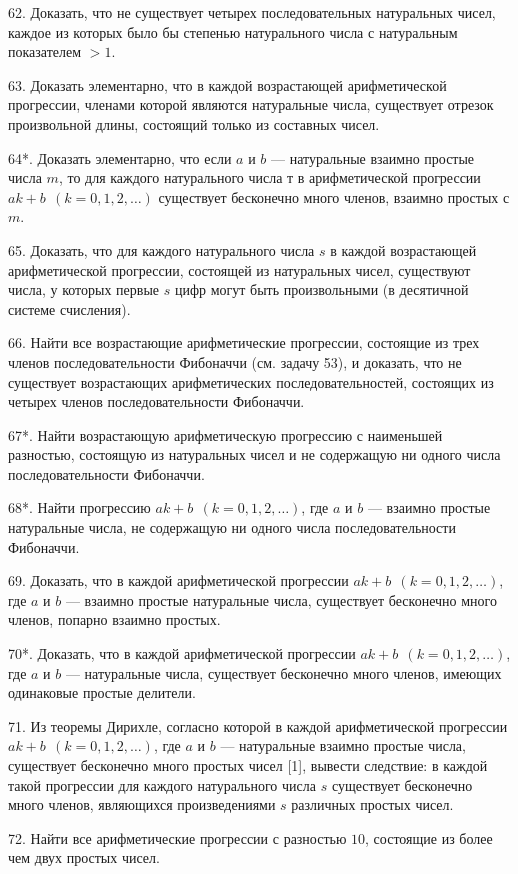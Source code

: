 \documentclass[12pt, a4paper, openany]{book}
\begin{document}
62. Доказать, что не существует четырех последовательных натуральных чисел, каждое из которых было бы степенью натурального числа с натуральным показателем $>1$.

63. Доказать элементарно, что в каждой возрастающей арифметической прогрессии, членами которой являются натуральные числа, существует отрезок произвольной длины, состоящий только из составных чисел.

64*. Доказать элементарно, что если $a$ и $b$ — натуральные взаимно простые числа $m$, то для каждого натурального числа т в арифметической прогрессии $ak+b \ \ (k=0,1,2,\ldots)$ существует бесконечно много членов, взаимно простых с $m$.

65. Доказать, что для каждого натурального числа $s$ в каждой возрастающей арифметической прогрессии, состоящей из натуральных чисел, существуют числа, у которых первые $s$ цифр могут быть произвольными (в десятичной системе счисления).

66. Найти все возрастающие арифметические прогрессии, состоящие из трех членов последовательности Фибоначчи (см. задачу 53), и доказать, что не существует возрастающих арифметических последовательностей, состоящих из четырех членов последовательности Фибоначчи.

67*. Найти возрастающую арифметическую прогрессию с наименьшей разностью, состоящую из натуральных чисел и не содержащую ни одного числа последовательности Фибоначчи.

68*. Найти прогрессию $ak+b \ \ (k=0,1,2,\ldots)$, где $a$ и $b$ — взаимно простые натуральные числа, не содержащую ни одного числа последовательности Фибоначчи.

69. Доказать, что в каждой арифметической прогрессии $ak+b \ \ (k=0,1,2,\ldots)$, где $a$ и $b$ — взаимно простые натуральные числа, существует бесконечно много членов, попарно взаимно простых.

70*. Доказать, что в каждой арифметической прогрессии $ak+b \ \ (k=0,1,2,\ldots)$, где $a$ и $b$ — натуральные числа, существует бесконечно много членов, имеющих одинаковые простые делители.

71. Из теоремы Дирихле, согласно которой в каждой арифметической прогрессии $ak+b \ \ (k=0,1,2,\ldots)$, где $a$ и $b$ — натуральные взаимно простые числа, существует бесконечно много простых чисел [1], вывести следствие: в каждой такой прогрессии для каждого натурального числа $s$ существует бесконечно много членов, являющихся произведениями $s$ различных простых чисел.

72. Найти все арифметические прогрессии с разностью $10$, состоящие из более чем двух простых чисел.
\end{document}
